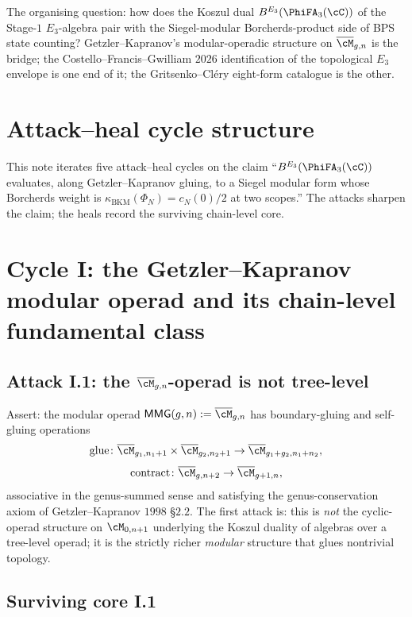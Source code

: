 The organising question: how does the Koszul dual $B^{E_3}(\PhiFA_3(\cC))$
of the Stage-$1$ $E_3$-algebra pair with the Siegel-modular
Borcherds-product side of BPS state counting? Getzler--Kapranov's
modular-operadic structure on $\overline{\cM}_{g, n}$ is the bridge; the
Costello--Francis--Gwilliam $2026$ identification of the topological
$E_3$ envelope is one end of it; the Gritsenko--Cl\'ery eight-form
catalogue is the other.

\section*{Attack--heal cycle structure}

This note iterates five attack--heal cycles on the claim
``$B^{E_3}(\PhiFA_3(\cC))$ evaluates, along Getzler--Kapranov gluing,
to a Siegel modular form whose Borcherds weight is
$\kappa_{\mathrm{BKM}}(\Phi_N) = c_N(0)/2$ at two scopes.'' The attacks
sharpen the claim; the heals record the surviving chain-level core.


\section{Cycle I: the Getzler--Kapranov modular operad and its
chain-level fundamental class}
\label{sec:cycle-1-gk-modular-operad}

\subsection*{Attack I.1: the $\overline{\cM}_{g, n}$-operad is not
tree-level}

Assert: the modular operad $\mathsf{MMG}(g, n) := \overline{\cM}_{g, n}$
has boundary-gluing and self-gluing operations
\[
 \mathrm{glue} \colon \overline{\cM}_{g_1, n_1 + 1} \times
 \overline{\cM}_{g_2, n_2 + 1} \to \overline{\cM}_{g_1 + g_2, n_1 + n_2},
\]
\[
 \mathrm{contract} \colon \overline{\cM}_{g, n + 2} \to
 \overline{\cM}_{g + 1, n},
\]
associative in the genus-summed sense and satisfying the
genus-conservation axiom of Getzler--Kapranov $1998$ \S$2.2$. The
first attack is: this is \emph{not} the cyclic-operad structure on
$\cM_{0, n + 1}$ underlying the Koszul duality of algebras over a
tree-level operad; it is the strictly richer \emph{modular} structure
that glues nontrivial topology.

\subsection*{Surviving core I.1}

